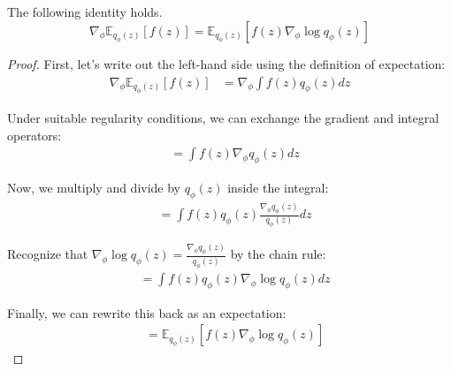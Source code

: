   \begin{lemma}
    The following identity holds. 
    \begin{equation}
      \nabla_\phi \mathbb{E}_{q_\phi(z)}[f(z)] = \mathbb{E}_{q_\phi(z)}[f(z)\nabla_\phi \log q_\phi(z)]
    \end{equation}
  \end{lemma}
  \begin{proof}
    First, let's write out the left-hand side using the definition of expectation:
    \begin{align*}
    \nabla_\phi \mathbb{E}_{q_\phi(z)}[f(z)] &= \nabla_\phi \int f(z)q_\phi(z)dz
    \end{align*}

    Under suitable regularity conditions, we can exchange the gradient and integral operators:
    \begin{align*}
    &= \int f(z)\nabla_\phi q_\phi(z)dz
    \end{align*}

    Now, we multiply and divide by $q_\phi(z)$ inside the integral:
    \begin{align*}
    &= \int f(z) q_\phi(z) \frac{\nabla_\phi q_\phi(z)}{q_\phi(z)} dz
    \end{align*}

    Recognize that $\nabla_\phi \log q_\phi(z) = \frac{\nabla_\phi q_\phi(z)}{q_\phi(z)}$ by the chain rule:
    \begin{align*}
    &= \int f(z) q_\phi(z) \nabla_\phi \log q_\phi(z) dz
    \end{align*}

    Finally, we can rewrite this back as an expectation:
    \begin{align*}
    &= \mathbb{E}_{q_\phi(z)}[f(z)\nabla_\phi \log q_\phi(z)]
    \end{align*}
  \end{proof}

